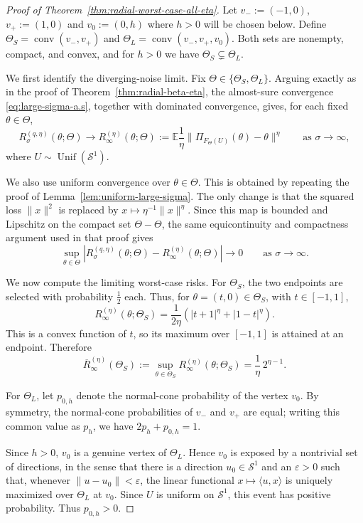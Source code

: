 \documentclass[11pt]{article}
\theoremstyle{plain}
\theoremstyle{definition}
\newcommand{\E}{\mathbb{E}}
\newcommand{\mcS}{\mathcal{S}}
\begin{document}
\begin{proof}[Proof of Theorem~\ref{thm:radial-worst-case-all-eta}]
Let $ v_-:=(-1,0)$, $v_+:=(1,0)$ and $v_0:=(0,h)$ where $h>0$ will be chosen below. Define $\Theta_S=\operatorname{conv}(v_-,v_+)$ and $\Theta_L=\operatorname{conv}(v_-,v_+,v_0)$. Both sets are nonempty, compact, and convex, and for $h>0$ we have
$\Theta_S\subsetneq\Theta_L$.

We first identify the diverging-noise limit. Fix
$\Theta\in\{\Theta_S,\Theta_L\}$. Arguing exactly as in the proof of
Theorem~\ref{thm:radial-beta-eta}, the almost-sure convergence
\eqref{eq:large-sigma-a.s}, together with dominated convergence, gives, for
each fixed $\theta\in\Theta$,
\[
    R_\sigma^{(q,\eta)}(\theta;\Theta)
    \longrightarrow
    R_{\infty}^{(\eta)}(\theta;\Theta)
    :=
    \E \frac1\eta
    \|
        \Pi_{F_\Theta(U)}(\theta)-\theta
    \|^\eta
    \qquad\text{as } \sigma\to\infty,
\]
where $U\sim\operatorname{Unif}(\mcS^1)$.

We also use uniform convergence over $\theta\in\Theta$. This is
obtained by repeating the proof of Lemma~\ref{lem:uniform-large-sigma}. The only change is that the squared loss $\|x\|^2$ is replaced by
$x\mapsto \eta^{-1}\|x\|^\eta$. Since this map is bounded and Lipschitz on
the compact set $\Theta-\Theta$, the same equicontinuity and compactness
argument used in that proof gives
\[
    \sup_{\theta\in\Theta}
    |
        R_\sigma^{(q,\eta)}(\theta;\Theta)
        -
        R_{\infty}^{(\eta)}(\theta;\Theta)
    |
    \longrightarrow 0
    \qquad\text{as } \sigma\to\infty .
\]

We now compute the limiting worst-case risks. For $\Theta_S$, the two
endpoints are selected with probability $\frac{1}{2}$ each. Thus, for
$\theta=(t,0)\in\Theta_S$, with $t\in[-1,1]$,
\[
    R_{\infty}^{(\eta)}(\theta;\Theta_S)
    =
    \frac1{2\eta}
    \left(
        |t+1|^\eta + |1-t|^\eta
    \right).
\]
This is a convex function of $t$, so its maximum over $[-1,1]$ is attained
at an endpoint. Therefore
\[
    \overline R_{\infty}^{(\eta)}(\Theta_S)
    :=
    \sup_{\theta\in\Theta_S}
    R_{\infty}^{(\eta)}(\theta;\Theta_S)
    =
    \frac1\eta\,2^{\eta-1}.
\]

For $\Theta_L$, let $p_{0,h}$ denote the normal-cone probability of the
vertex $v_0$. By symmetry, the normal-cone probabilities of $v_-$ and
$v_+$ are equal; writing this common value as $p_h$, we have $2p_h+p_{0,h}=1$.

Since $h>0$, $v_0$ is a genuine vertex of $\Theta_L$. Hence $v_0$ is
exposed by a nontrivial set of directions, in the sense that there is a direction
$u_0\in\mcS^1$ and an $\varepsilon>0$ such that, whenever
$\|u-u_0\|<\varepsilon$, the linear functional
$x\mapsto \langle u,x\rangle$ is uniquely maximized over $\Theta_L$ at
$v_0$. Since $U$ is uniform on $\mcS^1$, this event has positive
probability. Thus $p_{0,h}>0$.


\end{proof}
\end{document}
